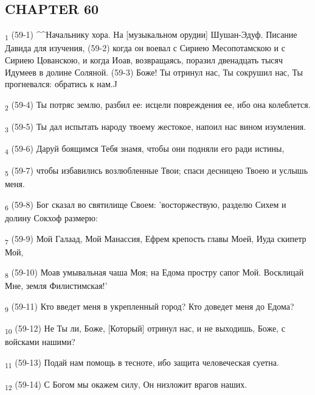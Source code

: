 \subsection{CHAPTER 60}
\begin{tcolorbox}
\textsubscript{1} (59-1) ^^Начальнику хора. На [музыкальном орудии] Шушан-Эдуф. Писание Давида для изучения, (59-2) когда он воевал с Сириею Месопотамскою и с Сириею Цованскою, и когда Иоав, возвращаясь, поразил двенадцать тысяч Идумеев в долине Соляной. (59-3) Боже! Ты отринул нас, Ты сокрушил нас, Ты прогневался: обратись к нам.^^
\end{tcolorbox}
\begin{tcolorbox}
\textsubscript{2} (59-4) Ты потряс землю, разбил ее: исцели повреждения ее, ибо она колеблется.
\end{tcolorbox}
\begin{tcolorbox}
\textsubscript{3} (59-5) Ты дал испытать народу твоему жестокое, напоил нас вином изумления.
\end{tcolorbox}
\begin{tcolorbox}
\textsubscript{4} (59-6) Даруй боящимся Тебя знамя, чтобы они подняли его ради истины,
\end{tcolorbox}
\begin{tcolorbox}
\textsubscript{5} (59-7) чтобы избавились возлюбленные Твои; спаси десницею Твоею и услышь меня.
\end{tcolorbox}
\begin{tcolorbox}
\textsubscript{6} (59-8) Бог сказал во святилище Своем: 'восторжествую, разделю Сихем и долину Сокхоф размерю:
\end{tcolorbox}
\begin{tcolorbox}
\textsubscript{7} (59-9) Мой Галаад, Мой Манассия, Ефрем крепость главы Моей, Иуда скипетр Мой,
\end{tcolorbox}
\begin{tcolorbox}
\textsubscript{8} (59-10) Моав умывальная чаша Моя; на Едома простру сапог Мой. Восклицай Мне, земля Филистимская!'
\end{tcolorbox}
\begin{tcolorbox}
\textsubscript{9} (59-11) Кто введет меня в укрепленный город? Кто доведет меня до Едома?
\end{tcolorbox}
\begin{tcolorbox}
\textsubscript{10} (59-12) Не Ты ли, Боже, [Который] отринул нас, и не выходишь, Боже, с войсками нашими?
\end{tcolorbox}
\begin{tcolorbox}
\textsubscript{11} (59-13) Подай нам помощь в тесноте, ибо защита человеческая суетна.
\end{tcolorbox}
\begin{tcolorbox}
\textsubscript{12} (59-14) С Богом мы окажем силу, Он низложит врагов наших.
\end{tcolorbox}
